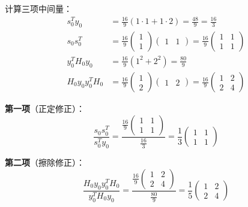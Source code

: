 {计算三项中间量：
\begin{align*}
s_0^T y_0 &= \frac{16}{9}(1\cdot 1 + 1\cdot 2) = \frac{48}{9} = \frac{16}{3} \\[4pt]
s_0 s_0^T &= \frac{16}{9}\begin{pmatrix} 1 \\ 1 \end{pmatrix}\begin{pmatrix} 1 & 1 \end{pmatrix}
           = \frac{16}{9}\begin{pmatrix} 1 & 1 \\ 1 & 1 \end{pmatrix} \\[4pt]
y_0^T H_0 y_0 &= \frac{16}{9}(1^2 + 2^2) = \frac{80}{9} \\[4pt]
H_0 y_0 y_0^T H_0 &= \frac{16}{9}\begin{pmatrix} 1 \\ 2 \end{pmatrix}\begin{pmatrix} 1 & 2 \end{pmatrix}
                    = \frac{16}{9}\begin{pmatrix} 1 & 2 \\ 2 & 4 \end{pmatrix}
\end{align*}

\textbf{第一项}（正定修正）：
\[
\frac{s_0 s_0^T}{s_0^T y_0}
= \frac{\frac{16}{9}\begin{pmatrix} 1 & 1 \\ 1 & 1 \end{pmatrix}}{\frac{16}{3}}
= \frac{1}{3}\begin{pmatrix} 1 & 1 \\ 1 & 1 \end{pmatrix}
\]

\textbf{第二项}（擦除修正）：
\[
\frac{H_0 y_0 y_0^T H_0}{y_0^T H_0 y_0}
= \frac{\frac{16}{9}\begin{pmatrix} 1 & 2 \\ 2 & 4 \end{pmatrix}}{\frac{80}{9}}
= \frac{1}{5}\begin{pmatrix} 1 & 2 \\ 2 & 4 \end{pmatrix}
\]

}
